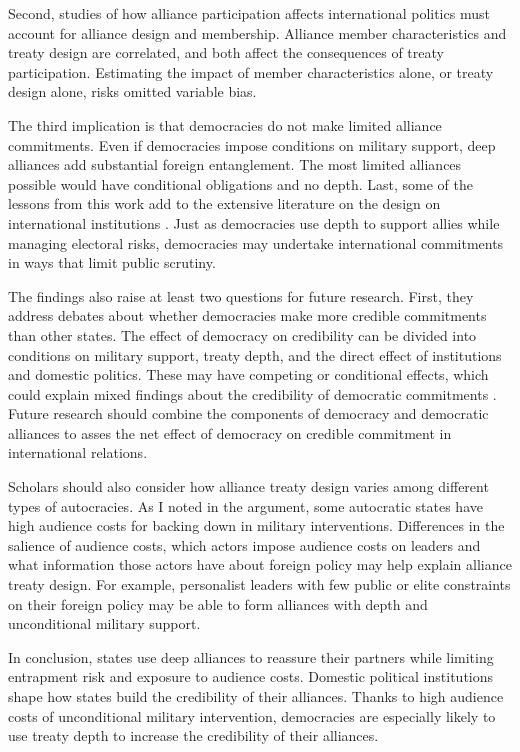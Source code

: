\documentclass[12pt]{article}
\begin{document}
Second, studies of how alliance participation affects international politics must account for alliance design and membership. 
Alliance member characteristics and treaty design are correlated, and both affect the consequences of treaty participation.   
Estimating the impact of member characteristics alone, or treaty design alone, risks omitted variable bias. 


The third implication is that democracies do not make limited alliance commitments. 
Even if democracies impose conditions on military support, deep alliances add substantial foreign entanglement.
The most limited alliances possible would have conditional obligations and no depth.  
Last, some of the lessons from this work add to the extensive literature on the design on international institutions \citep{DownesRocke1995, MartinSimmons1998, Koremenosetal2001, Koremenos2005, Thompson2010}.
Just as democracies use depth to support allies while managing electoral risks, democracies may undertake international commitments in ways that limit public scrutiny. 


The findings also raise at least two questions for future research.  
First, they address debates about whether democracies make more credible commitments than other states. 
The effect of democracy on credibility can be divided into conditions on military support, treaty depth, and the direct effect of institutions and domestic politics. 
These may have competing or conditional effects, which could explain mixed findings about the credibility of democratic commitments \citep{Schultz1999, Leeds1999, Thyne2012, DownesSechser2012, PotterBaum2014}.
Future research should combine the components of democracy and democratic alliances to asses the net effect of democracy on credible commitment in international relations. 


Scholars should also consider how alliance treaty design varies among different types of autocracies. 
As I noted in the argument, some autocratic states have high audience costs for backing down in military interventions. 
Differences in the salience of audience costs, which actors impose audience costs on leaders and what information those actors have about foreign policy \citep{Weeks2008} may help explain alliance treaty design.
For example, personalist leaders with few public or elite constraints on their foreign policy may be able to form alliances with depth and unconditional military support. 


In conclusion, states use deep alliances to reassure their partners while limiting entrapment risk and exposure to audience costs. 
Domestic political institutions shape how states build the credibility of their alliances.
Thanks to high audience costs of unconditional military intervention, democracies are especially likely to use treaty depth to increase the credibility of their alliances. 



\singlespace
 
 
\end{document}
